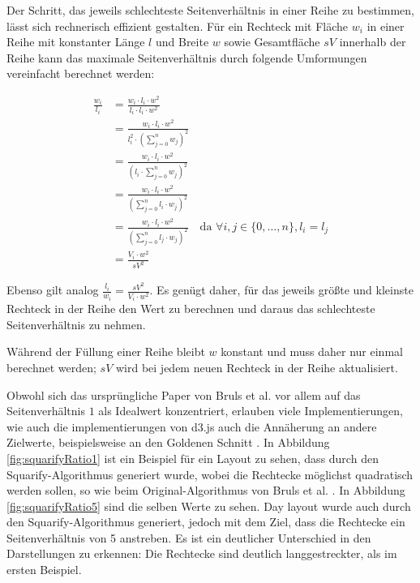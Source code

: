 \smallskip

Der Schritt, das jeweils schlechteste Seitenverhältnis in einer Reihe zu bestimmen, lässt sich rechnerisch effizient gestalten. Für ein Rechteck mit Fläche $w_i$ in einer Reihe mit konstanter Länge $l$ und Breite $w$ sowie Gesamtfläche $sV$ innerhalb der Reihe kann das maximale Seitenverhältnis durch folgende Umformungen vereinfacht berechnet werden:

\begin{align}
    \frac{w_i}{l_i} 
    &= \frac{w_i \cdot l_i \cdot w^2}{l_i \cdot l_i \cdot w^2} \\
    &= \frac{w_i \cdot l_i \cdot w^2}{l_i^2 \cdot \left(\sum_{j=0}^{n} w_j\right)^2} \\
    &= \frac{w_i \cdot l_i \cdot w^2}{\left(l_i \cdot \sum_{j=0}^{n} w_j\right)^2} \\
    &= \frac{w_i \cdot l_i \cdot w^2}{\left(\sum_{j=0}^{n} l_i \cdot w_j\right)^2} \\
    &= \frac{w_i \cdot l_i \cdot w^2}{\left(\sum_{j=0}^{n} l_j \cdot w_j\right)^2}
    \quad\text{da } \forall i, j \in \{0, \dots, n\}, l_i = l_j \\
    &= \frac{V_i \cdot w^2}{sV^2}
\end{align}

Ebenso gilt analog $ \frac{l_i}{w_i} = \frac{sV^2}{V_i \cdot w^2} $. Es genügt daher, für das jeweils größte und kleinste Rechteck in der Reihe den Wert zu berechnen und daraus das schlechteste Seitenverhältnis zu nehmen.

Während der Füllung einer Reihe bleibt $w$ konstant und muss daher nur einmal berechnet werden; $sV$ wird bei jedem neuen Rechteck in der Reihe aktualisiert.

\smallskip

Obwohl sich das ursprüngliche Paper von Bruls et al. \cite{bruls2000squarified} vor allem auf das Seitenverhältnis $1$ als Idealwert konzentriert, erlauben viele Implementierungen, wie auch die implementierungen von d3.js \cite{d3_treemap_code} auch die Annäherung an andere Zielwerte, beispielsweise an den Goldenen Schnitt \cite{goldenRatio}. 
In Abbildung \ref{fig:squarifyRatio1} ist ein Beispiel für ein Layout zu sehen, dass durch den Squarify-Algorithmus generiert wurde, wobei die Rechtecke möglichst quadratisch werden sollen, so wie beim Original-Algorithmus von Bruls et al. \cite{bruls2000squarified}. In Abbildung \ref{fig:squarifyRatio5} sind die selben Werte zu sehen. Day layout wurde auch durch den Squarify-Algorithmus generiert, jedoch mit dem Ziel, dass die Rechtecke ein Seitenverhältnis von 5 anstreben. Es ist ein deutlicher Unterschied in den Darstellungen zu erkennen: Die Rechtecke sind deutlich langgestreckter, als im ersten Beispiel.


